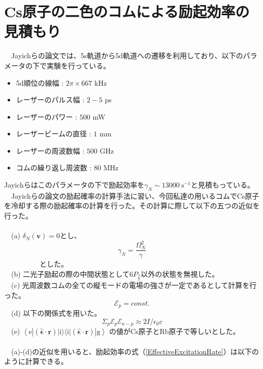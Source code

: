 \documentclass[uplatex, dvipdfmx, a4paper, report, papersize, 11pt]{jsbook}
\begin{document}
\section{Cs原子の二色のコムによる励起効率の見積もり}
　Jayichらの論文\cite{PhysRevX.6.041004}では、5s軌道から5d軌道への遷移を利用しており、以下のパラメータの下で実験を行っている。
\begin{itemize}
  \item 5d順位の線幅 : $2\pi \times 667$ kHz
  \item レーザーのパルス幅 : $2-5$ ps
  \item レーザーのパワー : $500$ mW
  \item レーザービームの直径 : $1$ mm
  \item レーザーの周波数幅 : $500$ GHz
  \item コムの繰り返し周波数 : $80$ MHz
\end{itemize}
Jayichらはこのパラメータの下で励起効率を$\gamma_N \sim 13000\ \mathrm{s^{-1}}$と見積もっている。\\
　Jayichらの論文\cite{PhysRevX.6.041004}の励起確率の計算手法に習い、今回私達の用いるコムでCs原子を冷却する際の励起確率の計算を行った。その計算に際して以下の五つの近似を行った。\\
\\
　(a) $\delta_N(\bm{v}) = 0$とし、
\begin{equation}
  \gamma_N = \frac{\Omega^2_N}{\gamma}
\end{equation}
　　　　　とした。\\
　(b) 二光子励起の際の中間状態として$6P_{\frac{3}{2}}$以外の状態を無視した。\\
　(c) 光周波数コムの全ての縦モードの電場の強さが一定であるとして計算を行った。
\begin{equation}
  \mathcal{E}_p = const.
\end{equation}
　(d) 以下の関係式を用いた。
\begin{equation}
  \Sigma_{p} \mathcal{E}_p\mathcal{E}_{n-p} \approx 2I/\epsilon_0 c
\end{equation}
　(e) $\left\langle \mathrm { e } \left| ( \hat { \boldsymbol { \epsilon } } \cdot \mathbf { r } ) | \mathrm { i } \rangle \langle \mathrm { i } |  ( \hat { \boldsymbol { \epsilon } } \cdot \mathbf { r } ) \right| \mathrm { g } \right\rangle$ の値がCs原子とRb原子で等しいとした。\\
\\
　(a)-(d)の近似を用いると、励起効率の式（\ref{EffectiveExcitationRate}）は以下のように計算できる。\\
\end{document}
